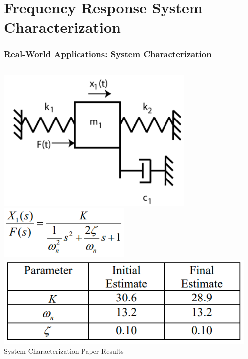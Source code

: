 \documentclass[aspectratio=169]{beamer}
\begin{document}
\section{Frequency Response System Characterization}
\begin{frame}
	\frametitle{Real-World Applications: System Characterization}
	\begin{columns}
		\begin{column}{0.375\textwidth}
			\centering
			\includegraphics[width=0.75\textwidth]{Images/sys_char_diagram.png}\\
			\includegraphics[width=0.5\textwidth]{Images/sys_char_tf.png}\\
			\includegraphics[width=\textwidth]{Images/sys_char_results.png}\\
			\footnotesize{System Characterization Paper Results 
			\cite{freq_response_charectorization}}
		\end{column}
		\begin{column}{0.5\textwidth}

\end{column}
\end{columns}
\end{frame}
\end{document}
